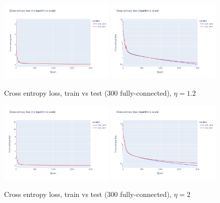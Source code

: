 \documentclass[12pt]{article}
\begin{document}
\begin{figure}[ht]
  \centering
  \includegraphics[width=0.49\textwidth]{images/cross-entropy-comparison-1-300-lr1.2.png}
  \includegraphics[width=0.49\textwidth]{images/cross-entropy-comparison-1-300-lr1.2-log.png}
  \caption{Cross entropy loss, train vs test ($300$ fully-connected), $\eta = 1.2$}
  \label{fig: learning rate comparison 1.2}
\end{figure}
\begin{figure}[ht]
  \centering
  \includegraphics[width=0.49\textwidth]{images/cross-entropy-comparison-1-300-lr2.png}
  \includegraphics[width=0.49\textwidth]{images/cross-entropy-comparison-1-300-lr2-log.png}
  \caption{Cross entropy loss, train vs test ($300$ fully-connected), $\eta = 2$}
  \label{fig: learning rate comparison 2}
\end{figure}
\end{document}
